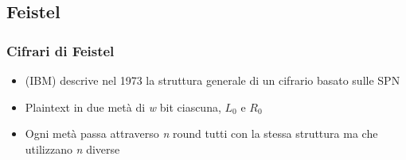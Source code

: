 	\subsection{Feistel}
	
	\begin{frame}
		\frametitle{Cifrari di Feistel}		
		\begin{itemize}
			\item {} (IBM) descrive nel 1973 la struttura generale di un cifrario basato sulle SPN
			\item Plaintext  in due metà di \emph{w} bit ciascuna, $L_0$ e $R_0$
			\item Ogni metà passa attraverso \emph{n} round tutti con la stessa struttura ma che utilizzano \emph{n}  diverse
		\end{itemize}
	\end{frame}

